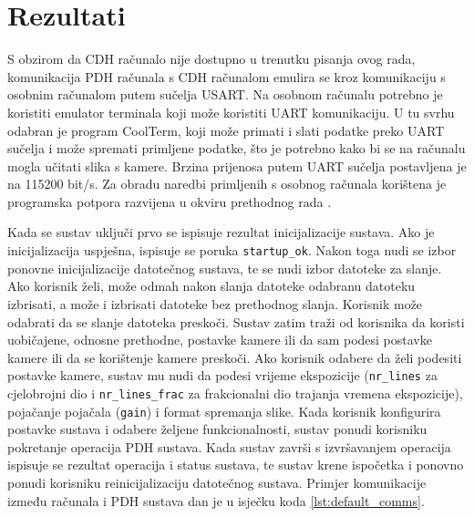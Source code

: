 \chapter{Rezultati}

S obzirom da CDH računalo nije dostupno u trenutku pisanja ovog rada,
komunikacija PDH računala s CDH računalom emulira se kroz komunikaciju s osobnim računalom
putem sučelja USART.
Na osobnom računalu potrebno je koristiti emulator terminala koji može koristiti UART komunikaciju. U tu svrhu odabran je program CoolTerm, 
koji može primati i slati podatke preko UART sučelja i može spremati  
primljene podatke, što je potrebno kako bi se na računalu mogla učitati slika s kamere. 
Brzina prijenosa putem UART sučelja postavljena je na 115200 bit/s.
Za obradu naredbi primljenih s osobnog računala korištena 
je programska potpora razvijena u okviru prethodnog rada \cite{diplomski_goran_petrak}.

Kada se sustav uključi prvo se ispisuje rezultat inicijalizacije sustava. Ako je inicijalizacija uspješna, ispisuje se poruka \verb|startup_ok|. Nakon toga nudi se izbor ponovne inicijalizacije datotečnog sustava, te se nudi izbor datoteke za slanje. Ako korisnik želi, može odmah nakon slanja datoteke odabranu datoteku izbrisati, a može i izbrisati datoteke bez prethodnog slanja. Korisnik može odabrati da se slanje datoteka preskoči. Sustav zatim traži od korisnika da koristi uobičajene, odnosne prethodne, postavke kamere ili da sam podesi postavke kamere ili da se korištenje kamere preskoči. Ako korisnik odabere da želi podesiti postavke kamere, sustav mu nudi da podesi vrijeme ekspozicije (\verb|nr_lines| za cjelobrojni dio i \verb|nr_lines_frac| za frakcionalni dio trajanja vremena ekspozicije), pojačanje pojačala (\verb|gain|) i format spremanja slike. Kada korisnik konfigurira postavke sustava i odabere željene funkcionalnosti,
sustav ponudi korisniku pokretanje operacija PDH sustava. Kada sustav završi s izvršavanjem operacija ispisuje se rezultat operacija i status sustava, te sustav krene ispočetka i ponovno ponudi korisniku reinicijalizaciju datotečnog sustava. Primjer komunikacije između računala i PDH sustava dan je u isječku koda \ref{lst:default_comms}.

